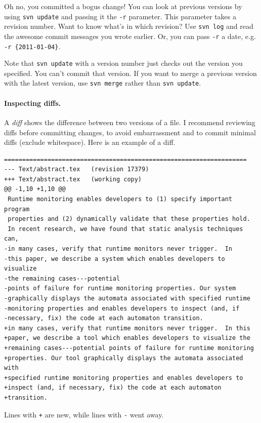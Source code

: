 Oh no, you committed a bogus change!  You can look at previous
versions by using {\tt svn update} and passing it the {\tt -r}
parameter. This parameter takes a revision number.  Want to know
what's in which revision?  Use {\tt svn log} and read the awesome
commit messages you wrote earlier. Or, you can pass {\tt -r} a date,
e.g. \verb+-r {2011-01-04}+.

Note that {\tt svn update} with a version number just checks out the
version you specified. You can't commit that version. If you want to
merge a previous version with the latest version, use {\tt svn merge}
rather than {\tt svn update}.

\paragraph{Inspecting diffs.} A \emph{diff} shows the difference
between two versions of a file. I recommend reviewing diffs
before committing changes, to avoid embarrassment and to commit
minimal diffs (exclude whitespace). Here is an example of a diff.
{ 
\hspace*{4em} 
\begin{verbatim}
===================================================================
--- Text/abstract.tex	(revision 17379)
+++ Text/abstract.tex	(working copy)
@@ -1,10 +1,10 @@
 Runtime monitoring enables developers to (1) specify important program
 properties and (2) dynamically validate that these properties hold.
 In recent research, we have found that static analysis techniques can,
-in many cases, verify that runtime monitors never trigger.  In
-this paper, we describe a system which enables developers to visualize
-the remaining cases---potential
-points of failure for runtime monitoring properties. Our system
-graphically displays the automata associated with specified runtime
-monitoring properties and enables developers to inspect (and, if
-necessary, fix) the code at each automaton transition.
+in many cases, verify that runtime monitors never trigger.  In this
+paper, we describe a tool which enables developers to visualize the
+remaining cases---potential points of failure for runtime monitoring
+properties. Our tool graphically displays the automata associated with
+specified runtime monitoring properties and enables developers to
+inspect (and, if necessary, fix) the code at each automaton
+transition.
\end{verbatim}
}

Lines with {\tt +} are new, while lines with {\tt -} went away.


